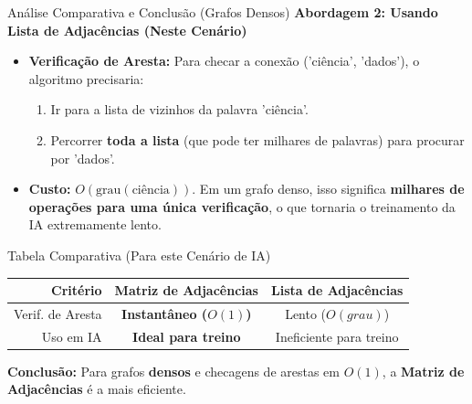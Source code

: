 \begin{frame}{Análise Comparativa e Conclusão (Grafos Densos)}
    \textbf{Abordagem 2: Usando Lista de Adjacências (Neste Cenário)}
    \begin{itemize}
        \item \textbf{Verificação de Aresta:} Para checar a conexão ('ciência', 'dados'), o algoritmo precisaria:
        \begin{enumerate}
            \item Ir para a lista de vizinhos da palavra 'ciência'.
            \item Percorrer \textbf{toda a lista} (que pode ter milhares de palavras) para procurar por 'dados'.
        \end{enumerate}
        \item<+-> \textbf{Custo:} $O(\text{grau}(\text{ciência}))$. Em um grafo denso, isso significa \textbf{milhares de operações para uma única verificação}, o que tornaria o treinamento da IA extremamente lento.
    \end{itemize}
    
    \pause %
    
    \begin{block}{Tabela Comparativa (Para este Cenário de IA)}
        \centering
        \begin{tabular}{r c c}
            \hline
            \textbf{Critério} & \textbf{Matriz de Adjacências} & \textbf{Lista de Adjacências} \\
            \hline
            Verif. de Aresta & \textbf{Instantâneo ($O(1)$)} & Lento ($O(grau)$) \\
            Uso em IA & \textbf{Ideal para treino} & Ineficiente para treino \\
            \hline
        \end{tabular}
    \end{block}
    
    \pause %
    
    \textbf{Conclusão:} Para grafos \textbf{densos} e checagens de arestas em \textbf{$O(1)$}, a \textbf{Matriz de Adjacências} é a mais eficiente.
\end{frame}